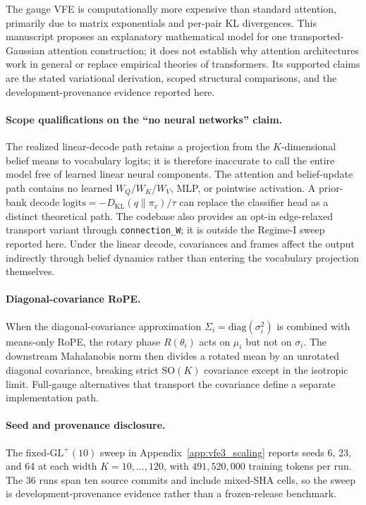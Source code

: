 \documentclass[twoside,11pt]{article}
\begin{document}
The gauge VFE is computationally more expensive than standard attention, primarily due to matrix exponentials and per-pair KL divergences. This manuscript proposes an explanatory mathematical model for one transported-Gaussian attention construction; it does not establish why attention architectures work in general or replace empirical theories of transformers. Its supported claims are the stated variational derivation, scoped structural comparisons, and the development-provenance evidence reported here.

\paragraph{Scope qualifications on the ``no neural networks'' claim.} The realized linear-decode path retains a projection from the $K$-dimensional belief means to vocabulary logits; it is therefore inaccurate to call the entire model free of learned linear neural components. The attention and belief-update path contains no learned $W_Q/W_K/W_V$, MLP, or pointwise activation. A prior-bank decode $\mathrm{logits}=-D_{\mathrm{KL}}(q\|\pi_v)/\tau$ can replace the classifier head as a distinct theoretical path. The codebase also provides an opt-in edge-relaxed transport variant through \texttt{connection\_W}; it is outside the Regime-I sweep reported here. Under the linear decode, covariances and frames affect the output indirectly through belief dynamics rather than entering the vocabulary projection themselves.

\paragraph{Diagonal-covariance RoPE.} When the diagonal-covariance approximation $\Sigma_i=\mathrm{diag}(\sigma_i^2)$ is combined with means-only RoPE, the rotary phase $R(\theta_i)$ acts on $\mu_i$ but not on $\sigma_i$. The downstream Mahalanobis norm then divides a rotated mean by an unrotated diagonal covariance, breaking strict $\mathrm{SO}(K)$ covariance except in the isotropic limit. Full-gauge alternatives that transport the covariance define a separate implementation path.

\paragraph{Seed and provenance disclosure.} The fixed-$\mathrm{GL}^+(10)$ sweep in Appendix~\ref{app:vfe3_scaling} reports seeds 6, 23, and 64 at each width $K=10,\ldots,120$, with $491{,}520{,}000$ training tokens per run. The 36 runs span ten source commits and include mixed-SHA cells, so the sweep is development-provenance evidence rather than a frozen-release benchmark.
\end{document}
